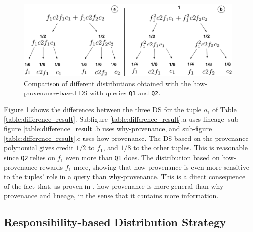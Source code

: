 \documentclass[preprint,12pt,sort&compress]{elsarticle}
\newcommand{\rtwo}[1]{\textcolor{reviewer2}{#1}}
\begin{document}
\begin{figure}[]
  \includegraphics[width=.8\textwidth]{figures/new_comparison}
  \caption{Comparison of different distributions obtained with the how-provenance-based DS with queries \texttt{Q1} and \texttt{Q2}.}
  \label{figure:distributions_differences}
\end{figure}


Figure \ref{figure:distributions_differences} shows the differences between the three DS for the tuple $o_1$ of Table \ref{table:difference_result}. Subfigure \ref{table:difference_result}.a uses lineage, sub-figure \ref{table:difference_result}.b uses why-provenance, and sub-figure \ref{table:difference_result}.c uses how-provenance. 
The DS based on the provenance polynomial gives credit $1/2$ to $f_1$, and $1/8$ to the other tuples.
This is reasonable since \texttt{Q2} relies on $f_1$ even more than \texttt{Q1} does. 
The distribution based on how-provenance rewards $f_1$ more, showing that how-provenance is even more sensitive to the tuples' role in a query than why-provenance. %
This is a direct consequence of the fact that, as proven in \citep{howProvenanceGreen}, how-provenance is more general than why-provenance and lineage, in the sense that it contains more information. 

\rtwo{\subsection{Responsibility-based Distribution Strategy}}

\end{document}
